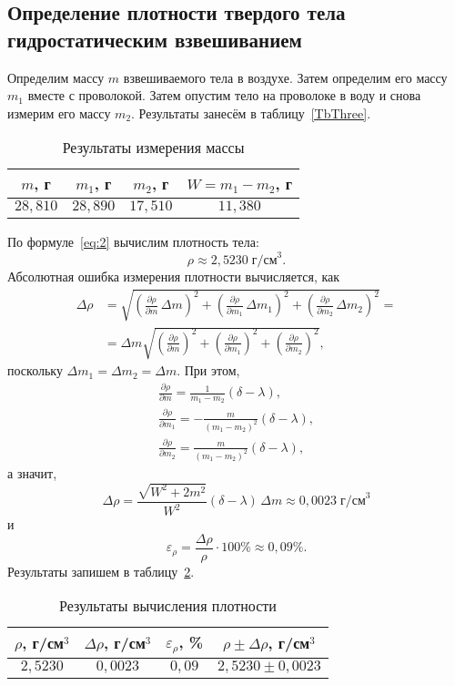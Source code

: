 \subsection{Определение плотности твердого тела гидростатическим взвешиванием}
Определим массу $m$ взвешиваемого тела в воздухе. Затем определим его массу $m_1$ вместе с проволокой. Затем опустим тело на проволоке  в воду и снова измерим его массу $m_2$. Результаты занесём в таблицу~\eqref{TbThree}.

\begin{table}[h!]
	\begin{center}
	\begin{tabular}{|c|c|c|c|}
		\hline
		$m$, г & $m_1$, г & $m_2$, г & $W=m_1-m_2$, г \\
		\hline
		$28{,}810$ & $28{,}890$ & $17{,}510$ & $11{,}380$ \\
		\hline
	\end{tabular}
	\caption{Результаты измерения массы}\label{TbThree}
	\end{center}
\end{table}

По формуле~\eqref{eq:2} вычислим плотность тела:
\[
\rho\approx2{,}5230\;\text{г/см}^3.
\]
Абсолютная ошибка измерения плотности вычисляется, как
\[
\begin{split}
	\Delta\rho & =\sqrt{\left(\frac{\partial\rho}{\partial m}\,\Delta m\right)^2+\left(\frac{\partial\rho}{\partial m_1}\,\Delta m_1\right)^2+\left(\frac{\partial\rho}{\partial m_2}\,\Delta m_2\right)^2}= \\
	& =\Delta m\sqrt{\left(\frac{\partial\rho}{\partial m}\right)^2+\left(\frac{\partial\rho}{\partial m_1}\right)^2+\left(\frac{\partial\rho}{\partial m_2}\right)^2},
\end{split}
\]
поскольку $\Delta m_1=\Delta m_2=\Delta m$. При этом,
\begin{gather*}
\frac{\partial\rho}{\partial m}=\frac{1}{m_1-m_2}(\delta-\lambda), \\
\frac{\partial\rho}{\partial m_1}=-\frac{m}{(m_1-m_2)^2}(\delta-\lambda), \\
\frac{\partial\rho}{\partial m_2}=\frac{m}{(m_1-m_2)^2}(\delta-\lambda),
\end{gather*}
а значит,
\[
\Delta\rho=\frac{\sqrt{W^2+2m^2}}{W^2}(\delta-\lambda)\,\Delta m\approx0{,}0023\;\text{г/см}^3
\]
и
\[
\varepsilon_\rho=\frac{\Delta\rho}{\rho}\cdot100\%\approx0{,}09\%.
\]
Результаты запишем в таблицу~\ref{TbFour}.

\begin{table}[h!]
	\begin{center}
	\begin{tabular}{|c|c|c|c|}
		\hline
		$\rho$, г/см$^3$ & $\Delta\rho$, г/см$^3$ & $\varepsilon_\rho$, \% & $\rho\pm\Delta\rho$, г/см$^3$ \\
		\hline
		$2{,}5230$ & $0{,}0023$ & $0{,}09$ & $2{,}5230\pm0{,}0023$ \\
		\hline
	\end{tabular}
	\caption{Результаты вычисления плотности}\label{TbFour}
	\end{center}
\end{table}